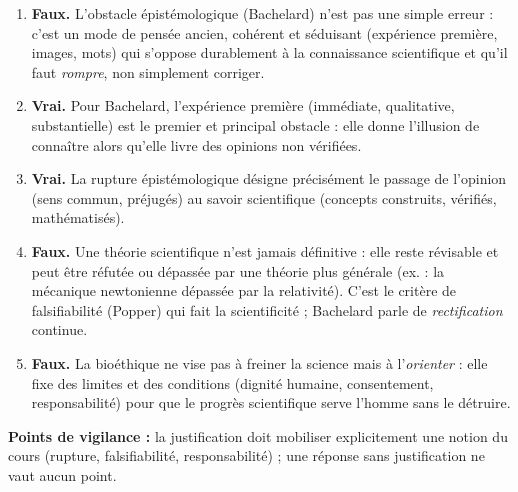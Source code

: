 \documentclass[11pt]{article}
\newcommand{\cle}[1]{{\popxbold\color{popdark}#1}}
\begin{document}
\begin{corrige}
\begin{enumerate}
    \item \textbf{Faux.} L'\cle{obstacle épistémologique} (Bachelard) n'est pas une simple erreur : c'est un mode de pensée ancien, cohérent et séduisant (expérience première, images, mots) qui s'oppose durablement à la connaissance scientifique et qu'il faut \emph{rompre}, non simplement corriger.
    \item \textbf{Vrai.} Pour Bachelard, l'\cle{expérience première} (immédiate, qualitative, substantielle) est le premier et principal obstacle : elle donne l'illusion de connaître alors qu'elle livre des opinions non vérifiées.
    \item \textbf{Vrai.} La \cle{rupture épistémologique} désigne précisément le passage de l'\cle{opinion} (sens commun, préjugés) au \cle{savoir scientifique} (concepts construits, vérifiés, mathématisés).
    \item \textbf{Faux.} Une théorie scientifique n'est jamais définitive : elle reste \cle{révisable} et peut être réfutée ou dépassée par une théorie plus générale (ex. : la mécanique newtonienne dépassée par la relativité). C'est le critère de \cle{falsifiabilité} (Popper) qui fait la scientificité ; Bachelard parle de \emph{rectification} continue.
    \item \textbf{Faux.} La \cle{bioéthique} ne vise pas à freiner la science mais à l'\emph{orienter} : elle fixe des limites et des conditions (dignité humaine, consentement, responsabilité) pour que le progrès scientifique serve l'homme sans le détruire.
\end{enumerate}
\textbf{Points de vigilance :} la justification doit mobiliser explicitement une notion du cours (rupture, falsifiabilité, responsabilité) ; une réponse sans justification ne vaut aucun point.
\end{corrige}
\end{document}
